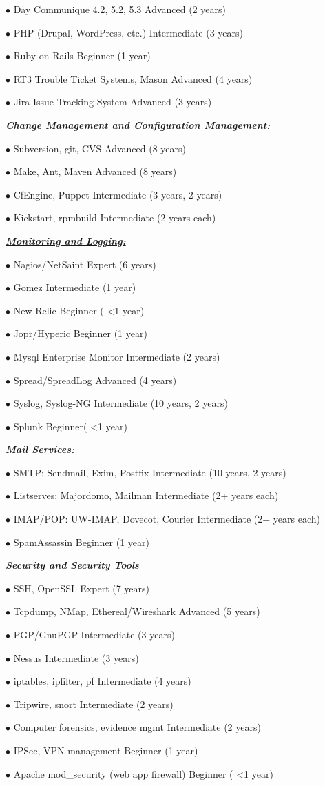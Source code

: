 \documentclass{article}
\newcommand{\skillset}[1]{{ \underline{\textbf{\emph{#1}}}\\  \nopagebreak }}
\newcommand{\skill}[2]{{$\bullet$ #1 \hfill #2 }}
\begin{document}
\skill{Day Communique 4.2, 5.2, 5.3}{Advanced (2 years)}

\skill{PHP (Drupal, WordPress, etc.)}{Intermediate (3 years)}

\skill{Ruby on Rails}{Beginner (1 year)}

\skill{RT3 Trouble Ticket Systems, Mason}{Advanced (4 years)}

\skill{Jira Issue Tracking System}{Advanced (3 years)}



\skillset{Change Management and Configuration Management: }

\skill{Subversion, git, CVS}{Advanced (8 years)}

\skill{Make, Ant, Maven}{Advanced (8 years)}

\skill{CfEngine, Puppet}{Intermediate (3 years, 2 years)}

\skill{Kickstart, rpmbuild}{Intermediate (2 years each)}



\skillset{Monitoring and Logging: }

\skill{Nagios/NetSaint}{Expert (6 years)}

\skill{Gomez}{Intermediate (1 year)}

\skill{New Relic}{Beginner ( \textless 1 year)}

\skill{Jopr/Hyperic}{Beginner (1 year)}

\skill{Mysql Enterprise Monitor}{Intermediate (2 years)}

\skill{Spread/SpreadLog}{Advanced (4 years)}

\skill{Syslog, Syslog-NG}{Intermediate (10 years, 2 years)}

\skill{Splunk}{Beginner( \textless 1 year)}



\skillset{Mail Services:}

\skill{SMTP: Sendmail, Exim, Postfix}{Intermediate (10 years, 2 years)}

\skill{Listserves: Majordomo, Mailman}{Intermediate (2+ years each)}

\skill{IMAP/POP: UW-IMAP, Dovecot, Courier}{Intermediate (2+ years each)}

\skill{SpamAssassin}{Beginner (1 year)}


\skillset{Security and Security Tools}

\skill{SSH, OpenSSL}{Expert (7 years)}

\skill{Tcpdump, NMap, Ethereal/Wireshark}{Advanced (5 years)}

\skill{PGP/GnuPGP}{Intermediate (3 years)}

\skill{Nessus}{Intermediate (3 years)}

\skill{iptables, ipfilter, pf}{Intermediate (4 years)}

\skill{Tripwire, snort}{Intermediate (2 years)}

\skill{Computer forensics, evidence mgmt}{Intermediate (2 years)}

\skill{IPSec, VPN management}{Beginner (1 year)}

\skill{Apache mod\_security (web app firewall)}{Beginner ( \textless 1 year)}
\end{document}
